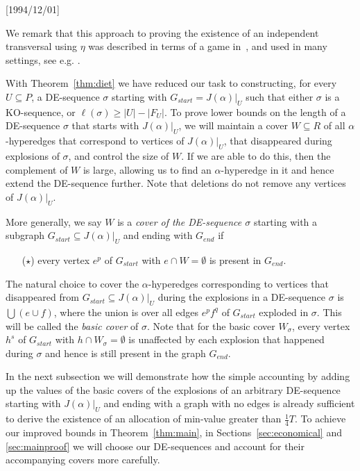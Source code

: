 \NeedsTeXFormat{LaTeX2e}[1994/12/01]\documentclass[letterpaper, 11pt]{article}
\theoremstyle{definition}
\theoremstyle{remark}
\numberwithin{equation}{section}
\begin{document}
We remark that this approach to proving the existence of an
independent transversal using $\eta$ was described in terms of a game
in~\cite{aharonibergerziv}, and used in many settings, see
e.g. \cite{aharbergkotlziv, aharonibergersprussel,
   aharholzhowaspru, haxell2, haxell3, haxellnarins}.

With Theorem~\ref{thm:diet} we have reduced our task to constructing,  
for every $U\subseteq P$, a DE-sequence $\sigma$ starting with
  $G_{start}=J(\alpha)|_U$ such that either $\sigma$ is a KO-sequence, or
  $\ell(\sigma)\geq |U|-|F_U|$.  
To prove lower bounds on the length of a DE-sequence $\sigma$ that
starts with $J(\alpha)|_U$, 
we will maintain a cover $W\subseteq R$ of all $\alpha$-hyperedges that
correspond to vertices of $J(\alpha)|_U$, that
disappeared during explosions of $\sigma$, and control
the size of $W$.
If we are able to do this, then the complement of $W$ is large,
allowing us to find an $\alpha$-hyperedge in it and hence
extend the DE-sequence further. 
Note that deletions do not remove any vertices of $J(\alpha)|_U$.

More generally, we say $W$ is a {\em cover of the DE-sequence $\sigma$}
starting with a subgraph $G_{start} \subseteq J(\alpha)|_U$ and
ending with $G_{end}$ if 
\begin{itemize}
\item[($\star$)]  every vertex $e^p$ of
$G_{start}$ with $e\cap W = \emptyset$ is present in $G_{end}$.
\end{itemize}
The natural choice to cover the $\alpha$-hyperedges corresponding
to vertices that disappeared from $G_{start} \subseteq J(\alpha)|_U$ 
during the explosions in a DE-sequence $\sigma$ is $\bigcup (e\cup f)$,
where the union is over all edges $e^pf^q$ of $G_{start}$
exploded in $\sigma$. This will be called the {\em basic cover} of
$\sigma$. Note that for the basic cover $W_{\sigma}$,
every vertex $h^s$ of $G_{start}$ with $h\cap W_{\sigma} =
\emptyset$ is unaffected by each explosion that happened during
$\sigma$ and hence is still present in the graph $G_{end}$.


In the next subsection we will demonstrate how the simple accounting
by adding up the values of the basic covers of the explosions of an
arbitrary DE-sequence starting with $J(\alpha)|_U$ and ending with a
graph with no edges
is already sufficient to derive the existence of an allocation of
min-value greater than  $\frac{1}{4}T$.
To achieve our improved bounds in Theorem~\ref{thm:main}, in Sections~\ref{sec:economical} and
\ref{sec:mainproof} we will choose our DE-sequences
and account for their accompanying covers more carefully.
\end{document}
